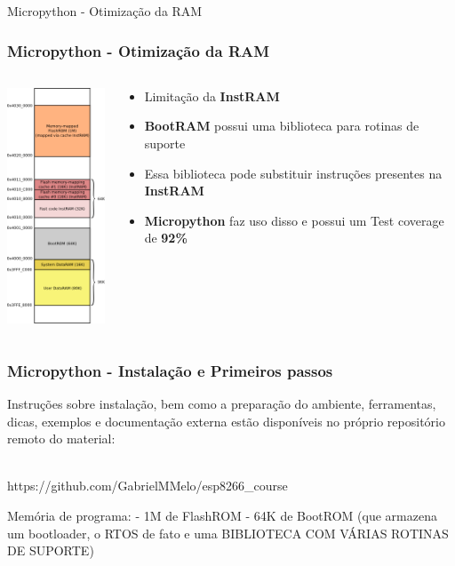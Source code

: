 \documentclass[10pt, compress]{beamer}
\begin{document}
\begin{frame}{Micropython - Otimização da RAM}
  \frametitle{Micropython - Otimização da RAM}
  \begin{columns}
    \begin{column}{0.48\textwidth}
      \begin{center}
        \includegraphics[width=95pt]{images/mem-mapping.png}\\
      \end{center}
    \end{column}
    \begin{column}{0.48\textwidth}
      \begin{center}
        \begin{itemize}
          \item Limitação da \textbf{InstRAM} \vspace{5pt}
          \item \textbf{BootRAM} possui uma biblioteca para rotinas de suporte\vspace{5pt}
          \item Essa biblioteca pode substituir instruções presentes na \textbf{InstRAM}\vspace{5pt}
          \item \textbf{Micropython} faz uso disso e possui um Test coverage de \textbf{92\%}\vspace{5pt}
        \end{itemize}
      \end{center}
    \end{column}
  \end{columns}
\end{frame}

\begin{frame}
  \frametitle{Micropython - Instalação e Primeiros passos}
  Instruções sobre instalação, bem como a preparação do ambiente, ferramentas, dicas, exemplos e documentação externa estão disponíveis no próprio repositório remoto do material: \\\\
  \begin{center}
    https://github.com/GabrielMMelo/esp8266\_course
  \end{center}
\end{frame}
    Memória de programa:
      - 1M de FlashROM
      - 64K de BootROM (que armazena um bootloader, o RTOS de fato e uma BIBLIOTECA COM VÁRIAS ROTINAS DE SUPORTE)
\end{document}
